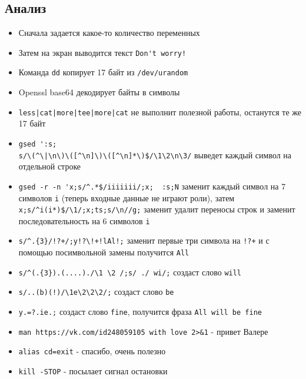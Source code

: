 \documentclass[12pt, a4paper]{article}
\begin{document}
\subsection*{Анализ}
\begin{itemize}
  \item Сначала задается какое-то количество переменных
  \item Затем на экран выводится текст \verb|Don't worry!|
  \item Команда \verb|dd| копирует 17 байт из \verb|/dev/urandom|
  \item Openssl base64 декодирует байты в символы
  \item \verb=less|cat|more|tee|more|cat= не выполнит полезной работы,
    останутся те же 17 байт
  \item \verb|gsed ':s;|\\
    \verb=s/\(^\|\n\)\([^\n]\)\([^\n]*\)$/\1\2\n\3/= выведет каждый символ на
    отдельной строке
  \item \verb=gsed -r -n 'x;s/^.*$/iiiiiii/;x;  :s;N= заменит каждый символ
    на 7 символов \verb|i| (теперь входные данные не играют роли), затем\\
    \verb|x;s/^i(i*)$/\1/;x;ts;s/\n//g;| заменит удалит переносы строк и заменит
    последовательность на 6 символов \verb|i|
  \item \verb|s/^.{3}/!?+/;y!?\!+!lAl!;| заменит первые три символа на \verb|!?+|
    и с помощью посимвольной замены получится \verb|All|
  \item \verb|s/^(.{3}).(....)./\1 \2 /;s/ ./ wi/;| создаст слово \verb|will|
  \item \verb|s/..(b)(!)/\1e\2\2\2/;| создаст слово \verb|be|
  \item \verb|y.=?.ie.;| создаст слово \verb|fine|, получится фраза
    \verb|All will be fine|
  \item \verb|man https://vk.com/id248059105 with love 2>&1| - привет Валере
  \item \verb|alias cd=exit| - спасибо, очень полезно
  \item \verb|kill -STOP| - посылает сигнал остановки
\end{itemize}
\end{document}
